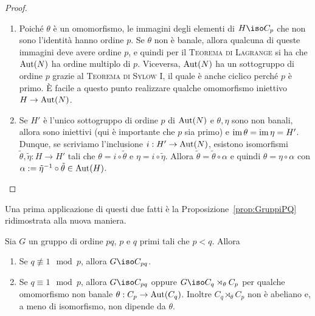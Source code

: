 \begin{proof}
\begin{enumerate}
\item Poiché $\theta$ è un omomorfismo, le immagini degli elementi di $H \iso C_p$ che non sono l'identità hanno ordine $p$. Se $\theta$ non è banale, allora qualcuna di queste immagini deve avere ordine $p$, e quindi per il {\scshape Teorema di Lagrange} si ha che $\mathrm{Aut}(N)$ ha ordine multiplo di $p$. Viceversa, $\mathrm{Aut}(N)$ ha un sottogruppo di ordine $p$ grazie al {\scshape Teorema di Sylow I}, il quale è anche ciclico perché $p$ è primo. È facile a questo punto realizzare qualche omomorfismo iniettivo \(H \to \mathrm{Aut}(N)\).
%
\item Se $H'$ è l'unico sottogruppo di ordine $p$ di $\mathrm{Aut}(N)$ e $\theta, \eta$ sono non banali, allora sono iniettivi (qui è importante che $p$ sia primo) e $\operatorname{im} \theta = \operatorname{im}\eta = H'$. Dunque, se scriviamo l'inclusione $i : H' \to \mathrm{Aut}(N)$, esistono isomorfismi $\tilde\theta,\tilde\eta : H \to H'$ tali che $\theta = i \circ \tilde\theta$ e $\eta = i \circ \tilde\eta$. Allora $\tilde\theta = \tilde\theta \circ \alpha$ e quindi $\theta = \eta \circ \alpha$ con $\alpha := \tilde\eta^{-1} \circ \tilde{\theta} \in \mathrm{Aut}(H)$. \qedhere
\end{enumerate}
\end{proof}



Una prima applicazione di questi due fatti è la Proposizione~\ref{prop:GruppiPQ} ridimostrata alla nuova maniera.

\begin{prop}
Sia $G$ un gruppo di ordine $pq$, $p$ e $q$ primi tali che $p<q$. Allora
\begin{enumerate}
\item Se $q \nequiv 1 \mod p$, allora $G\iso C_{pq}$.
\item Se $q \equiv 1 \mod p$, allora $G \iso C_{pq}$ oppure $G\iso C_q \rtimes_\theta C_p$ per qualche omomorfismo non banale $\theta : C_p \to \mathrm{Aut}(C_q)$. Inoltre $C_q\rtimes_{\theta}C_p$ non è abeliano e, a meno di isomorfismo, non dipende da $\theta$. 
\end{enumerate}
\end{prop}

